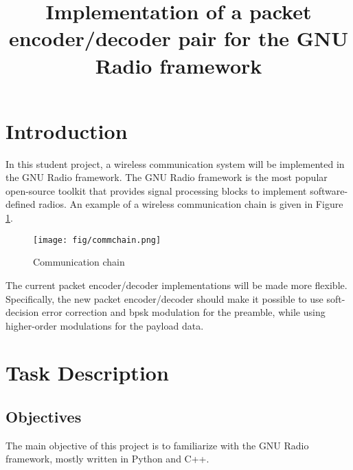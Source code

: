 \documentclass[12pt,english]{TCLsem}
\begin{document}



\title{Implementation of a packet encoder/decoder pair for the GNU Radio framework }




\maketitle


\section{Introduction}
In this student project, a wireless communication system will be implemented in the GNU Radio framework. The GNU Radio framework is the most popular open-source toolkit that provides signal processing blocks to implement software-defined radios. An example of a wireless communication chain is given in Figure \ref{fcommchain}.

\begin{figure}[H]
\hspace*{-1cm}
\begin{center}
\texttt{[image: fig/commchain.png]}
\end{center} 
\caption{Communication chain}
\label{fcommchain}
\end{figure}

The current packet encoder/decoder implementations will be made more flexible. Specifically, the new packet encoder/decoder should make it possible to use soft-decision error correction and \gls{bpsk} modulation for the preamble, while using higher-order modulations for the payload data.

\section{Task Description} 
\subsection{Objectives}
The main objective of this project is to familiarize with the GNU Radio framework, mostly written in Python and C++. \\ 
\end{document}
